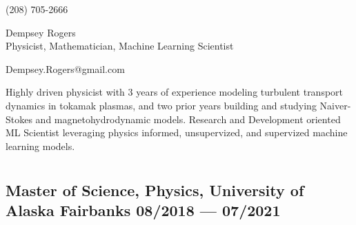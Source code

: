 \documentclass[letterpaper,11pt]{article}
\begin{document}



\begin{center}
    \begin{minipage}[b]{0.24\textwidth}
            \large (208) 705-2666 
    \end{minipage}%
    \begin{minipage}[b]{0.45\textwidth}
            \centering
            {\Huge Dempsey Rogers} \\ %
            \vspace{0.1cm}
            {\color{cvblue} \Large{Physicist, Mathematician, Machine Learning Scientist}} \\
    \end{minipage}%
    \begin{minipage}[t]{0.24\textwidth}
           \flushright 
            \vspace{-.19in}

            \large{Dempsey.Rogers@gmail.com}

    \end{minipage}   

\vspace{-0.15cm} 
{\color{cvblue} \hrulefill}
\end{center}
\vspace{-0.2cm}
Highly driven physicist with 3 years of experience modeling turbulent transport dynamics in tokamak plasmas, and two prior years building and studying Naiver-Stokes and magnetohydrodynamic models. Research and Development oriented ML Scientist leveraging physics informed, unsupervized, and supervized machine learning models. 

\vspace{-0.2cm}


\section*{\color{cvblue}{Education} }
\subsection*{{\color{cvblue}Master of Science, Physics,} {University of Alaska Fairbanks} \hfill 08/2018 --- 07/2021} 
\end{document}
